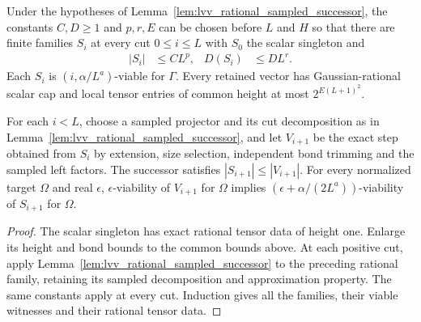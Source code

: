 \begin{lemma}
    \label{lem:lvv_rational_sampled_induction}
    \leanok
    Under the hypotheses of Lemma~\ref{lem:lvv_rational_sampled_successor},
    the constants $C,D\ge1$ and $p,r,E$ can be chosen before $L$ and
    $H$ so that there are finite families $S_i$ at every cut
    $0\le i\le L$ with $S_0$ the scalar singleton and
    \begin{align*}
        |S_i| & \le CL^p, & D(S_i) & \le DL^r.
    \end{align*}
    Each $S_i$ is $(i,\alpha/L^a)$-viable for $\Gamma$. Every retained
    vector has Gaussian-rational scalar cap and local tensor entries
    of common height at most $2^{E(L+1)^2}$.

    For each $i<L$, choose a sampled projector and its cut decomposition
    as in Lemma~\ref{lem:lvv_rational_sampled_successor}, and let $V_{i+1}$
    be the exact step obtained from $S_i$ by extension, size selection,
    independent bond trimming and the sampled left factors.
    The successor satisfies $|S_{i+1}|\le|V_{i+1}|$. For every normalized
    target $\Omega$ and real $\epsilon$, $\epsilon$-viability of
    $V_{i+1}$ for $\Omega$ implies
    $(\epsilon+\alpha/(2L^a))$-viability of $S_{i+1}$ for $\Omega$.
\end{lemma}
\begin{proof}
    \leanok
    The scalar singleton has exact rational tensor data of height one.
    Enlarge its height and bond bounds to the common bounds above.
    At each positive cut, apply
    Lemma~\ref{lem:lvv_rational_sampled_successor} to the preceding
    rational family, retaining its sampled decomposition and approximation
    property. The same constants apply at every cut. Induction gives
    all the families, their viable witnesses and their rational tensor data.
\end{proof}
